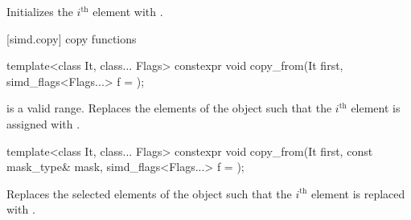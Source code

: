 \begin{itemdescr}
  \SimdLoadDescr
    {\validMaskedRange}
    {Initializes the $i^\text{th}$ element with  \foralli.}
\end{itemdescr}

[simd.copy]{ copy functions}

\begin{itemdecl}
template<class It, class... Flags>
  constexpr void copy_from(It first, simd_flags<Flags...> f = {});
\end{itemdecl}

\begin{itemdescr}
  \SimdLoadDescr
    { is a valid range.}
    {Replaces the elements of the  object such that the $i^\text{th}$ element is assigned with  \foralli.}
\end{itemdescr}

\begin{itemdecl}
template<class It, class... Flags>
  constexpr void copy_from(It first, const mask_type& mask, simd_flags<Flags...> f = {});
\end{itemdecl}

\begin{itemdescr}
  \SimdLoadDescr
    {\validMaskedRange}
    {Replaces the selected elements of the  object such that the $i^\text{th}$ element is replaced with  \forallmaskedi.}
\end{itemdescr}

\newcommand\SimdStoreDescr[2]{
  \pnum\constraints
  \begin{itemize}
    \item \tcode{iter_value_t<Out>} is a vectorizable type, and
    \item \tcode{Out} models \tcode{contiguous_iterator}, and
    \item \tcode{Out} models \tcode{indirectly_writable<value_type>}.
  \end{itemize}

  \pnum\mandates
  \conversionFlagsMandate{value_type}{iter_value_t<Out>}

  \pnum\expects
  \begin{itemize}
    \item #1
    \flagsRequires{basic_simd, iter_value_t<Out>}{iter_value_t<Out>}
  \end{itemize}

  \pnum\effects #2
}

